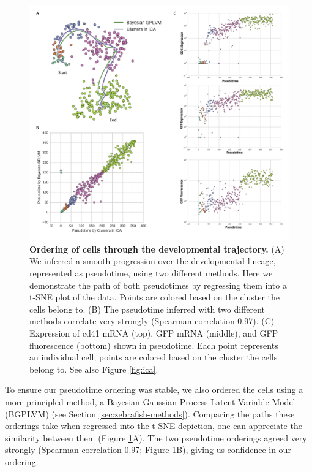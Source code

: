 \begin{figure}
    \centering
    \includegraphics[width=\textwidth]{"Figure2"}
    \caption[Ordering of cells through the developmental trajectory]{\textbf{Ordering of cells through the developmental trajectory.} (A)	We inferred a smooth progression over the developmental lineage, represented as pseudotime, using two different methods. Here we demonstrate the path of both pseudotimes by regressing them into a t-SNE plot of the data. Points are colored based on the cluster the cells belong to. (B)	The pseudotime inferred with two different methods correlate very strongly (Spearman correlation 0.97). (C)	Expression of cd41 mRNA (top), GFP mRNA (middle), and GFP fluorescence (bottom) shown in pseudotime. Each point represents an individual cell; points are colored based on the cluster the cells belong to. See also Figure \ref{fig:ica}.}
    \label{fig:pseudotime}
\end{figure}

To ensure our pseudotime ordering was stable, we also ordered the cells using a more principled method, a Bayesian Gaussian Process Latent Variable Model (BGPLVM) \cite{Titsias2010-hq} (see Section \ref{sec:zebrafish-methods}). Comparing the paths these orderings take when regressed into the t-SNE depiction, one can appreciate the similarity between them (Figure \ref{fig:pseudotime}A). The two pseudotime orderings agreed very strongly (Spearman correlation 0.97; Figure \ref{fig:pseudotime}B), giving us confidence in our ordering.


